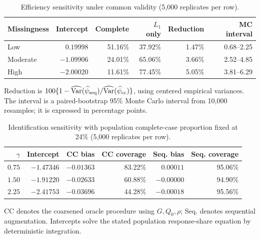 \begin{table}[htbp]
\centering
\begin{threeparttable}
\caption{Efficiency sensitivity under common validity (5,000 replicates per row).}
\label{tab:sensitivity-efficiency}
\small
\setlength{\tabcolsep}{4pt}
\begin{tabular}{@{}lrrrrr@{}}
\toprule
Missingness & Intercept & Complete & $L_1$ only & Reduction & MC interval \\
\midrule
Low & $0.19998$ & 51.16\% & 37.92\% & 1.47\% & 0.68--2.25 \\
Moderate & $-1.09906$ & 24.01\% & 65.06\% & 3.66\% & 2.52--4.85 \\
High & $-2.00020$ & 11.61\% & 77.45\% & 5.05\% & 3.81--6.29 \\
\bottomrule
\end{tabular}
\begin{tablenotes}[flushleft]\footnotesize
\item Reduction is $100\{1-\widehat{\operatorname{Var}}(\widehat\psi_{\mathrm{seq}})/\widehat{\operatorname{Var}}(\widehat\psi_{\mathrm{cc}})\}$, using centered empirical variances. The interval is a paired-bootstrap 95\% Monte Carlo interval from 10,000 resamples; it is expressed in percentage points.
\end{tablenotes}
\end{threeparttable}
\end{table}
\begin{table}[htbp]
\centering
\begin{threeparttable}
\caption{Identification sensitivity with population complete-case proportion fixed at 24\% (5,000 replicates per row).}
\label{tab:sensitivity-identification}
\small
\setlength{\tabcolsep}{4pt}
\begin{tabular}{@{}rrrrrr@{}}
\toprule
$\gamma$ & Intercept & CC bias & CC coverage & Seq. bias & Seq. coverage \\
\midrule
$0.75$ & $-1.47346$ & $-0.01363$ & 83.22\% & $0.00011$ & 95.06\% \\
$1.50$ & $-1.91220$ & $-0.02633$ & 60.88\% & $-0.00000$ & 94.90\% \\
$2.25$ & $-2.41753$ & $-0.03696$ & 44.28\% & $-0.00018$ & 95.56\% \\
\bottomrule
\end{tabular}
\begin{tablenotes}[flushleft]\footnotesize
\item CC denotes the coarsened oracle procedure using $G,Q_0,\rho$; Seq. denotes sequential augmentation. Intercepts solve the stated population response-share equation by deterministic integration.
\end{tablenotes}
\end{threeparttable}
\end{table}


